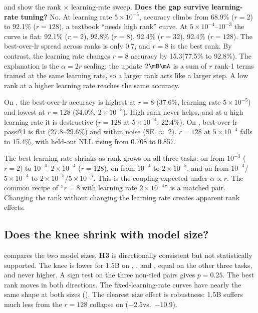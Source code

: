  and  show the rank $\times$ learning-rate sweep. {\bf Does the \emotion gap survive learning-rate tuning?} No. At learning rate $5\times10^{-5}$, \emotion accuracy climbs from 68.9\% ($r{=}2$) to 92.1\% ($r{=}128$), a textbook ``needs high rank'' curve. At $5\times10^{-4}$--$10^{-3}$ the curve is flat: 92.1\% ($r{=}2$), 92.8\% ($r{=}8$), 92.4\% ($r{=}32$), 92.4\% ($r{=}128$). The best-over-lr spread across ranks is only 0.7\pp, and $r{=}8$ is the best rank. By contrast, the learning rate changes $r{=}8$ accuracy by 15.3\pp (77.5\% to 92.8\%). The explanation is the $\alpha=2r$ scaling: the update $2\mB\mA$ is a sum of $r$ rank-1 terms trained at the same learning rate, so a larger rank acts like a larger step. A low rank at a higher learning rate reaches the same accuracy.

On \gsm, the best-over-lr accuracy is highest at $r{=}8$ (37.6\%, learning rate $5\times10^{-5}$) and lowest at $r{=}128$ (34.0\%, $2\times10^{-5}$). High rank never helps, and at a high learning rate it is destructive ($r{=}128$ at $5\times10^{-4}$: 22.4\%). On \code, best-over-lr pass@1 is flat (27.8--29.6\%) and within noise (SE $\approx$ 2\pp). $r{=}128$ at $5\times10^{-4}$ falls to 15.4\%, with held-out NLL rising from 0.708 to 0.857.

The best learning rate shrinks as rank grows on all three tasks: on \emotion from $10^{-3}$ ($r{=}2$) to $10^{-4}$--$2\times10^{-4}$ ($r{=}128$), on \gsm from $10^{-4}$ to $2\times10^{-5}$, and on \code from $10^{-4}$/$5\times10^{-4}$ to $2\times10^{-5}$/$5\times10^{-5}$. This is the coupling expected under $\alpha\propto r$. The common recipe of ``$r{=}8$ with learning rate $2\times10^{-4}$'' is a matched pair. Changing the rank without changing the learning rate creates apparent rank effects.

\subsection{Does the knee shrink with model size?}
\label{sec:res_size}



 compares the two model sizes. {\bf H3} is directionally consistent but not statistically supported. The knee is lower for 1.5B on \sst, \emotion, and \boolq, equal on the other three tasks, and never higher. A sign test on the three non-tied pairs gives $p=0.25$. The best rank moves in both directions. The fixed-learning-rate curves have nearly the same shape at both sizes (). The clearest size effect is robustness: 1.5B suffers much less from the $r{=}128$ collapse on \boolq ($-2.5$\pp vs.\ $-10.9$\pp).

